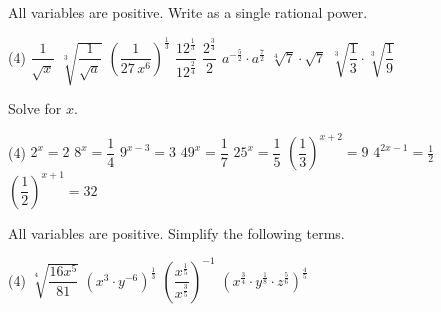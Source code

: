 \begin{manualexercise}{8}
	All variables are positive. Write as a single rational power.
	\begin{tasks}(4)
		\task $\dfrac{1}{\sqrt{x}}$
		\task $\sqrt[3]{\dfrac{1}{\sqrt{a}}}$
		\task $\left(\dfrac{1}{27\,x^6}\right)^{\frac{1}{3}}$
		\task $\dfrac{12^{\frac{1}{3}}}{12^{\frac{2}{4}}}$
		\task $\dfrac{2^{\frac{3}{4}}}{2}$
		\task $a^{-\frac{5}{2}}\cdot a^\frac{7}{2}$
		\task $\sqrt[4]{7}\cdot\sqrt{7}$
		\task $\sqrt[3]{\dfrac{1}{3}}\cdot\sqrt[3]{\dfrac{1}{9}}$
	\end{tasks}
\end{manualexercise}
\vspace*{8pt}
\begin{manualexercise}{9}
	Solve for $x$.
	\begin{tasks}(4)
		\task $2^x=2$
		\task $8^x=\dfrac{1}{4}$
		\task $9^{x-3}=3$
		\task $49^x=\dfrac{1}{7}$
		\task $25^x=\dfrac{1}{5}$
		\task $\left(\dfrac{1}{3}\right)^{x+2}=9$
		\task $4^{2x-1}=\frac{1}{2}$
		\task $\left(\dfrac{1}{2}\right)^{x+1}=32$
	\end{tasks}
\end{manualexercise}
\vspace*{8pt}
\begin{manualexercise}{10}
	All variables are positive. Simplify the following terms.
	\begin{tasks}(4)
		\task $\sqrt[4]{\dfrac{16x^5}{81}}$
		\task $\left(x^3\cdot y^{-6}\right)^{\frac{1}{3}}$
		\task $\left(\dfrac{x^{\frac{1}{5}}}{x^{\frac{3}{5}}}\right)^{-1}$
		\task $\left(x^\frac{3}{4}\cdot y^\frac{1}{8}\cdot z^\frac{5}{6}\right)^\frac{4}{5}$
	\end{tasks}
\end{manualexercise}